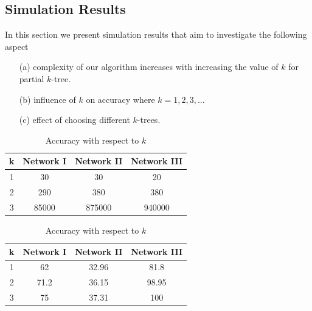 \documentclass[12pt]{article}
\begin{document}
\subsection{Simulation Results}
In this section we present simulation results that aim to investigate the following aspect 
\begin{itemize}
\item[(a)] complexity of our algorithm increases with increasing the value of $k$ for partial $k$-tree.
\item[(b)] influence of $k$ on accuracy where $k=1,2,3,..$.
\item[(c)] effect of choosing different $k$-trees.
\end{itemize}
 
\begin{table}[!htb]
    \begin{minipage}{.5\linewidth}
    \caption{Running time (RT) with respect to $k$}
      \centering
     \begin{tabular}{|c|c|c|c|}
     \hline
         k& Network I & Network II & Network III \\
     \hline
     1&30& 30& 20 \\\hline
     2&290 &380&380	\\\hline
3 &85000&875000&940000	 \\\hline
 



\end{tabular}
    \end{minipage}
    \begin{minipage}{.5\linewidth}
      \caption{Accuracy with respect to $k$}
      \centering
     \begin{tabular}{|c|c|c|c|}
     \hline
     k& Network I & Network II & Network III \\
     \hline
      1 & 62&32.96& 81.8 \\\hline
2 &71.2 & 36.15& 98.95\\\hline
3 &75& 37.31& 100\\\hline
\end{tabular}
    \end{minipage}\\
    
\end{table}
\end{document}

